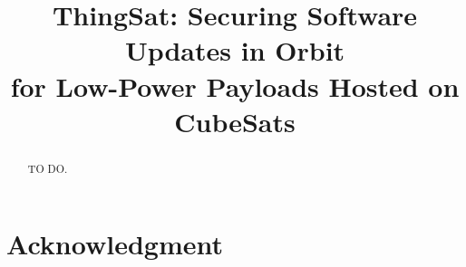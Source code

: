 \documentclass[conference]{IEEEtran}
\begin{document}

\title{ThingSat: Securing Software Updates in Orbit \\ for Low-Power Payloads Hosted on CubeSats}

\author{
}

\maketitle

\begin{abstract}
TO DO.
\end{abstract}

\IEEEpeerreviewmaketitle










\section*{Acknowledgment}



\end{document}

